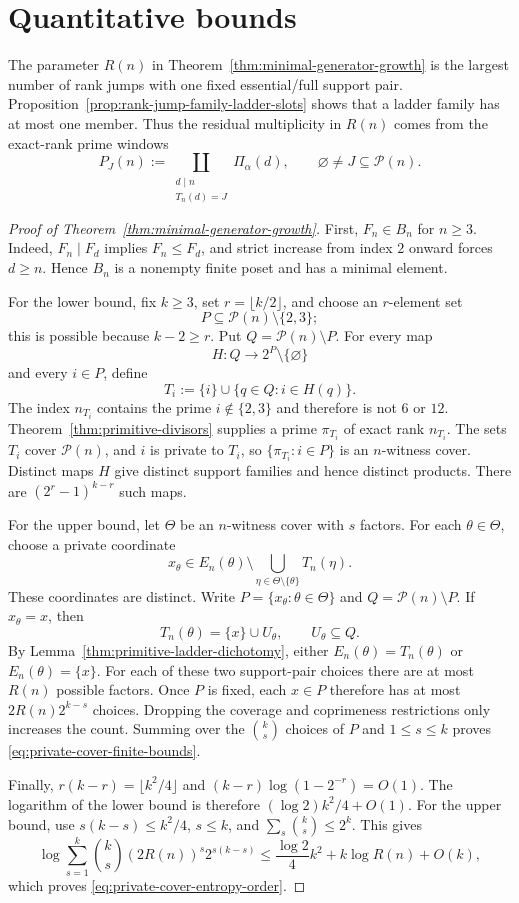 \section{Quantitative bounds}\label{sec:growth}

The parameter $R(n)$ in Theorem~\ref{thm:minimal-generator-growth} is the
largest number of rank jumps with one fixed essential/full support pair.
Proposition~\ref{prop:rank-jump-family-ladder-slots} shows that a ladder
family has at most one member.  Thus the residual multiplicity in $R(n)$
comes from the exact-rank prime windows
\[
 P_J(n):=\coprod_{\substack{d\mid n\\T_n(d)=J}}\Pi_\alpha(d),
 \qquad \varnothing\ne J\subseteq\mathcal P(n).
\]

\begin{proof}[Proof of Theorem~\ref{thm:minimal-generator-growth}]
First, $F_n\in B_n$ for $n\geq3$.  Indeed, $F_n\mid F_d$ implies
$F_n\leq F_d$, and strict increase from index $2$ onward forces $d\geq n$.
Hence $B_n$ is a nonempty finite poset and has a minimal element.

For the lower bound, fix $k\geq3$, set $r=\lfloor k/2\rfloor$, and choose
an $r$-element set
\[
 P\subseteq\mathcal P(n)\setminus\{2,3\};
\]
this is possible because $k-2\geq r$.  Put
$Q=\mathcal P(n)\setminus P$.  For every map
\[
 H:Q\longrightarrow2^P\setminus\{\varnothing\}
\]
and every $i\in P$, define
\[
 T_i:=\{i\}\cup\{q\in Q:i\in H(q)\}.
\]
The index $n_{T_i}$ contains the prime $i\notin\{2,3\}$ and therefore is
not $6$ or $12$.  Theorem~\ref{thm:primitive-divisors} supplies a prime
$\pi_{T_i}$ of exact rank $n_{T_i}$.  The sets $T_i$ cover
$\mathcal P(n)$, and $i$ is private to $T_i$, so
$\{\pi_{T_i}:i\in P\}$ is an $n$-witness cover.  Distinct maps $H$ give
distinct support families and hence distinct products.  There are
$(2^r-1)^{k-r}$ such maps.

For the upper bound, let $\Theta$ be an $n$-witness cover with $s$ factors.
For each $\theta\in\Theta$, choose a private coordinate
\[
 x_\theta\in E_n(\theta)\setminus
 \bigcup_{\eta\in\Theta\setminus\{\theta\}}T_n(\eta).
\]
These coordinates are distinct.  Write
$P=\{x_\theta:\theta\in\Theta\}$ and
$Q=\mathcal P(n)\setminus P$.  If $x_\theta=x$, then
\[
 T_n(\theta)=\{x\}\cup U_\theta,\qquad U_\theta\subseteq Q.
\]
By Lemma~\ref{thm:primitive-ladder-dichotomy}, either
$E_n(\theta)=T_n(\theta)$ or $E_n(\theta)=\{x\}$.  For each of these two
support-pair choices there are at most $R(n)$ possible factors.  Once $P$ is
fixed, each $x\in P$ therefore has at most
$2R(n)2^{k-s}$ choices.  Dropping the coverage and coprimeness restrictions
only increases the count.  Summing over the $\binom{k}{s}$ choices of $P$
and $1\leq s\leq k$ proves \eqref{eq:private-cover-finite-bounds}.

Finally, $r(k-r)=\lfloor k^2/4\rfloor$ and
$(k-r)\log(1-2^{-r})=O(1)$.  The logarithm of the lower bound is therefore
$(\log2)k^2/4+O(1)$.  For the upper bound, use
$s(k-s)\leq k^2/4$, $s\leq k$, and
$\sum_s\binom{k}{s}\leq2^k$.  This gives
\[
 \log\sum_{s=1}^k\binom{k}{s}(2R(n))^s2^{s(k-s)}
 \leq\frac{\log2}{4}k^2+k\log R(n)+O(k),
\]
which proves \eqref{eq:private-cover-entropy-order}.
\end{proof}

